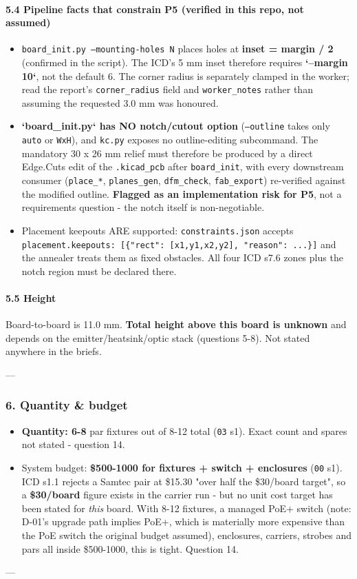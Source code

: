 \documentclass[11pt,a4paper]{article}
\begin{document}
\paragraph*{5.4 Pipeline facts that constrain P5 (verified in this repo, not assumed)}
\begin{itemize}
\item \texttt{board\_init.py --mounting-holes N} places holes at \textbf{inset = margin / 2}
(confirmed in the script). The ICD's 5 mm inset therefore requires
\textbf{`--margin 10`}, not the default 6. The corner radius is separately clamped
in the worker; read the report's \texttt{corner\_radius} field and \texttt{worker\_notes}
rather than assuming the requested 3.0 mm was honoured.
\item \textbf{`board\_init.py` has NO notch/cutout option} (\texttt{--outline} takes only \texttt{auto}
or \texttt{WxH}), and \texttt{kc.py} exposes no outline-editing subcommand. The mandatory
30 x 26 mm relief must therefore be produced by a direct Edge.Cuts edit of
the \texttt{.kicad\_pcb} after \texttt{board\_init}, with every downstream consumer
(\texttt{place\_{*}}, \texttt{planes\_gen}, \texttt{dfm\_check}, \texttt{fab\_export}) re-verified against the
modified outline. \textbf{Flagged as an implementation risk for P5}, not a
requirements question - the notch itself is non-negotiable.
\item Placement keepouts ARE supported: \texttt{constraints.json} accepts
\texttt{placement.keepouts: {[}\{"rect": {[}x1,y1,x2,y2{]}, "reason": ...\}{]}} and the
annealer treats them as fixed obstacles. All four ICD s7.6 zones plus the
notch region must be declared there.
\end{itemize}
\paragraph*{5.5 Height}
Board-to-board is 11.0 mm. \textbf{Total height above this board is unknown} and depends on the emitter/heatsink/optic stack (questions 5-8). Not stated anywhere in the briefs.

---

\subsubsection*{6. Quantity \& budget}
\begin{itemize}
\item \textbf{Quantity: 6-8} par fixtures out of 8-12 total (\texttt{03} s1). Exact count and
spares not stated - question 14.
\item System budget: \textbf{\$500-1000 for fixtures + switch + enclosures} (\texttt{00} s1).
ICD s1.1 rejects a Samtec pair at \$15.30 "over half the \$30/board target",
so a \textbf{\$30/board} figure exists in the carrier run - but no unit cost target
has been stated for \emph{this} board. With 8-12 fixtures, a managed PoE+ switch
(note: D-01's upgrade path implies PoE+, which is materially more expensive
than the PoE switch the original budget assumed), enclosures, carriers,
strobes and pars all inside \$500-1000, this is tight. Question 14.
\end{itemize}
---
\end{document}
